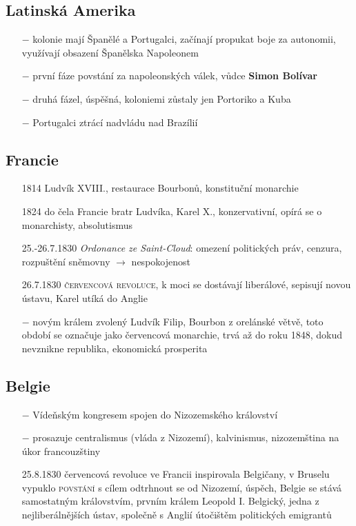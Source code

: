 \documentclass{article}
\begin{document}
\subsection*{Latinská Amerika}
\begin{itemize}
    \vspace{-0.5em}
    \setlength\itemsep{0.15em}
    \item[$-$] kolonie mají Španělé a Portugalci, začínají propukat boje za autonomii, využívají obsazení Španělska Napoleonem
    \item[$-$] první fáze povstání za napoleonských válek, vůdce \textbf{Simon Bolívar}
    \item[$-$] druhá fázel, úspěšná, koloniemi zůstaly jen Portoriko a Kuba
    \item[$-$] Portugalci ztrácí nadvládu nad Brazílií
\end{itemize}

\subsection*{Francie}
\begin{itemize}
    \vspace{-0.5em}
    \setlength\itemsep{0.15em}
    \item[1814] Ludvík XVIII., restaurace Bourbonů, konstituční monarchie
    \item[1824] do čela Francie bratr Ludvíka, Karel X., konzervativní, opírá se o monarchisty, absolutismus
    \item[25.-26.7.1830] \textit{Ordonance ze Saint-Cloud}: omezení politických práv, cenzura,  rozpuštění sněmovny $\rightarrow$ nespokojenost
    \item[26.7.1830] \textsc{červencová revoluce}, k moci se dostávají liberálové, sepisují novou ústavu, Karel utíká do Anglie
    \item[$-$] novým králem zvolený Ludvík Filip, Bourbon z orelánské větvě, toto období se označuje jako červencová monarchie, trvá až do roku 1848, dokud nevznikne republika, ekonomická prosperita
\end{itemize}

\subsection*{Belgie}
\begin{itemize}
    \vspace{-0.5em}
    \setlength\itemsep{0.15em}
    \item[$-$] Vídeňským kongresem spojen do Nizozemského království
    \item[$-$] prosazuje centralismus (vláda z Nizozemí), kalvinismus, nizozemština na úkor francouzštiny
    \item[25.8.1830] červencová revoluce ve Francii inspirovala Belgičany, v Bruselu vypuklo \textsc{povstání} s cílem odtrhnout se od Nizozemí, úspěch, Belgie se stává samostatným královstvím, prvním králem Leopold I. Belgický, jedna z nejliberálnějších ústav, společně s Anglií útočištěm politických emigrantů
\end{itemize}
\end{document}
